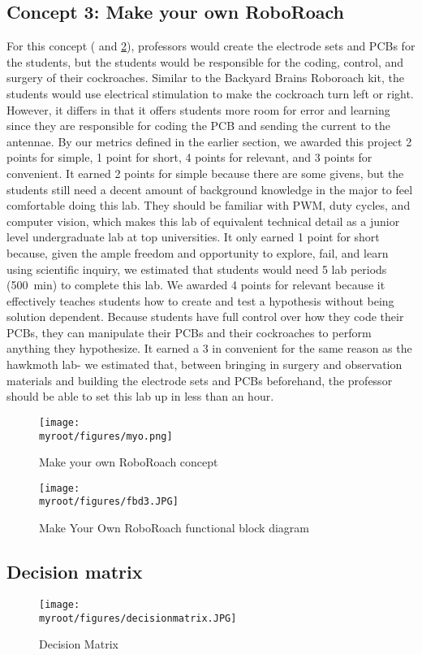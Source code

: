 \documentclass[twocolumn,10pt]{IEEEtran}
\newcommand{\myroot}{.}
\begin{document}
\subsection{Concept 3: Make your own RoboRoach}
For this concept ( and \ref{fig:FBD3}), professors would create the electrode sets and PCBs for the students, but the students would be responsible for the coding, control, and surgery of their cockroaches. Similar to the Backyard Brains Roboroach kit, the students would use electrical stimulation to make the cockroach turn left or right. However, it differs in that it offers students more room for error and learning since they are responsible for coding the PCB and sending the current to the antennae. By our metrics defined in the earlier section, we awarded this project 2 points for simple, 1 point for short, 4 points for relevant, and 3 points for convenient. It earned 2 points for simple because there are some givens, but the students still need a decent amount of background knowledge in the major to feel comfortable doing this lab. They should be familiar with PWM, duty cycles, and computer vision, which makes this lab of equivalent technical detail as a junior level undergraduate lab at top universities. It only earned 1 point for short because, given the ample freedom and opportunity to explore, fail, and learn using scientific inquiry, we estimated that students would need 5 lab periods (\SI{500}{\minute}) to complete this lab. We awarded 4 points for relevant because it effectively teaches students how to create and test a hypothesis without being solution dependent. Because students have full control over how they code their PCBs, they can manipulate their PCBs and their cockroaches to perform anything they hypothesize. It earned a 3 in convenient for the same reason as the hawkmoth lab- we estimated that, between bringing in surgery and observation materials and building the electrode sets and PCBs beforehand, the professor should be able to set this lab up in less than an hour.
\begin{figure}[ht!]
\centering
\texttt{[image: \\myroot/figures/myo.png]}
\caption{Make your own RoboRoach concept}
\label{fig:concept3}
\end{figure}
\begin{figure}[ht!]
\centering
\texttt{[image: \\myroot/figures/fbd3.JPG]}
\caption{Make Your Own RoboRoach functional block diagram}
\label{fig:FBD3}
\end{figure}

\subsection{Decision matrix}
\begin{figure}[ht!]
\centering
\texttt{[image: \\myroot/figures/decisionmatrix.JPG]}
\caption{Decision Matrix}
\label{fig:DecisionMatrix}
\end{figure}
\end{document}
